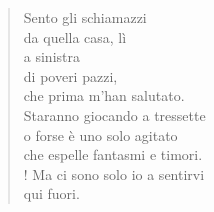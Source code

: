 
\begin{verse}
    Sento gli schiamazzi\\
    da quella casa, lì\\
    a sinistra\\
    di poveri pazzi,\\
    che prima m'han salutato.\\
    Staranno giocando a tressette\\
    o forse è uno solo agitato\\
    che espelle fantasmi e timori.\\!
    Ma ci sono solo io a sentirvi\\
    qui fuori.
\end{verse}